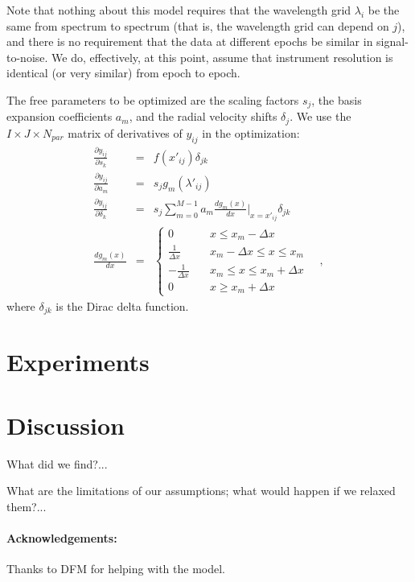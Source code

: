 \documentclass[12pt, letterpaper]{article}
\newcommand{\given}{\,|\,}
\newcommand{\normal}{{\mathcal{N}}}
\begin{document}
Note that nothing about this model requires that the wavelength grid
$\lambda_i$ be the same from spectrum to spectrum (that is, the
wavelength grid can depend on $j$), and there is no requirement that
the data at different epochs be similar in signal-to-noise. We do,
effectively, at this point, assume that instrument resolution is
identical (or very similar) from epoch to epoch.

The free parameters to be optimized are the scaling factors $s_j$, the basis expansion
coefficients $a_m$, and the radial velocity shifts $\delta_j$. We use the $I\times J\times N_{par}$ matrix 
of derivatives of $y_{ij}$ in the optimization:
\begin{eqnarray}
  \frac{\partial y_{ij}}{\partial s_k} &=& f(x'_{ij}) \delta_{jk}
  \\
  \frac{\partial y_{ij}}{\partial a_m} &=& s_j g_m(\lambda'_{ij})
  \\
  \frac{\partial y_{ij}}{\partial \delta_k}  &=& 
  s_j \sum_{m=0}^{M-1} a_m \frac{dg_m(x)}{dx}\bigg\rvert_{x=x'_{ij}} 
  \delta_{jk}
  \\
    \frac{dg_m(x)}{dx} &=& \left\{
        \begin{array}{ll}
            0 & \quad x \leq x_m -\Delta x \\
            \frac{1}{\Delta x} & \quad x_m - \Delta x \leq x \leq x_m \\
            - \frac{1}{\Delta x} & \quad x_m \leq x \leq x_m + \Delta x \\
            0 & \quad x \geq x_m + \Delta x
        \end{array}
    \right.
  \quad ,
\end{eqnarray}
where $\delta_{jk}$ is the Dirac delta function.

\section{Experiments}

\section{Discussion}

What did we find?...

What are the limitations of our assumptions; what would happen if we relaxed them?...

\paragraph{Acknowledgements:}
Thanks to DFM for helping with the model.
\end{document}
